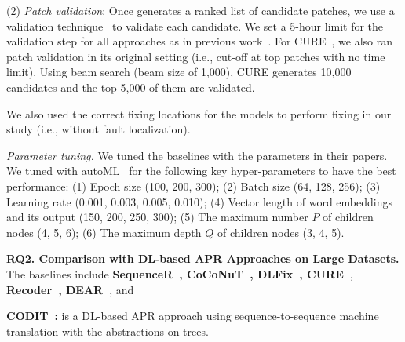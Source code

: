 (2) {\em Patch validation}: Once {\tool} generates a ranked list of
candidate patches, we use a validation
technique~\cite{saha2017elixir,jiang2018shaping} to validate each
candidate.
We set a 5-hour limit for the validation step for all approaches as in
previous work~\cite{icse20,tbar-issta19}.
For CURE~\cite{cure-icse21}, we also ran patch validation in its
original setting (i.e., cut-off at top patches with no time
limit). Using beam search (beam size of 1,000), CURE generates 10,000
candidates and the top 5,000 of them are validated.


We also used the correct fixing locations for the models to perform
fixing in our study (i.e., without fault localization).



{\em Parameter tuning.} We tuned the baselines with the
parameters in their papers.
We tuned {\tool} with autoML~\cite{NNI} for the following key
hyper-parameters to have the best performance: (1) Epoch size (100,
200, 300); (2) Batch size (64, 128, 256); (3) Learning rate (0.001,
0.003, 0.005, 0.010); (4) Vector length of word embeddings and its
output (150, 200, 250, 300); (5) The maximum number $P$ of children
nodes (4, 5, 6); (6) The maximum depth $Q$ of children nodes (3, 4,
5).

\vspace{2pt} {\bf RQ2. Comparison with DL-based APR Approaches on
  Large Datasets.} The baselines include {\bf
  Sequen\-ceR~\cite{chen2018sequencer},
  CoCoNuT~\cite{lutellier2020coconut}, DLFix~\cite{icse20},
  CURE~\cite{cure-icse21}}, {\bf Recoder~\cite{recoder-fse21},
  DEAR~\cite{icse22}}, and

{\bf CODIT~\cite{chakrabortycodit}:} is a DL-based APR approach
using sequence-to-sequence machine translation with the
abstractions on trees.

